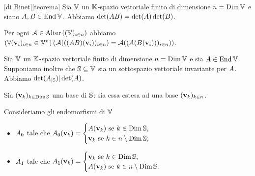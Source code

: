 \begin{Theorem}
	[di Binet][teorema]
  Sia $\mathbb{V}$ un $\mathbb{K}$-spazio vettoriale finito di dimensione
  $n = \operatorname{\operatorname{Dim}}{\mathbb{V}}$ e siano
  $A, B
    \in \operatorname{End}{\mathbb{V}}$.
  Abbiamo
  $\operatorname{det}(AB)
  = \operatorname{det}(A)\operatorname{det}(B)$.
\end{Theorem}
\Proof Per ogni
$\mathcal{A} \in \text{Alter} \left ( (\mathbb{V})_{i \in n} \right )$
abbiamo
$\left ( \forall (\mathbf{v}_i)_{i \in n} \in \mathbb{V}^n \right ) \left ( 
  \mathcal{A}(((AB)(
    \mathbf{v}_i))_{i \in n})
  = \mathcal{A}((A(B(
    \mathbf{v}_i)))_{i \in n}) \right )$. \EndProof
\begin{Corollary}
  Sia $\mathbb{V}$ un $\mathbb{K}$-spazio vettoriale finito di dimensione
  $n = \operatorname{\operatorname{Dim}}{\mathbb{V}}$ e sia
  $A \in \operatorname{End}{\mathbb{V}}$.
  Supponiamo inoltre che
  $\mathbb{S} \subseteq \mathbb{V}$
  sia un sottospazio vettoriale invariante per $A$.
  Abbiamo
  $\operatorname{det}({A}_{|\mathbb{S}})
  | \operatorname{det}(A)$.
\end{Corollary}
\Proof Sia 
$(\mathbf{v}_k)_{k \in \operatorname{Dim}{\mathbb{S}}}$
una base di $\mathbb{S}$:
sia essa estesa ad una base
$(\mathbf{v}_k)_{k \in n}$.
\par Consideriamo gli endomorfismi di $\mathbb{V}$
\begin{itemize}
  \item $A_0$ tale che
    $A_0(\mathbf{v}_k) =
      \begin{cases}
        A(\mathbf{v}_k)\text{ se }
          k \in \operatorname{Dim}{\mathbb{S}},\\
        \mathbf{v}_k\text{ se }
          k \in n \setminus \operatorname{Dim}{\mathbb{S}};
      \end{cases}$
  \item $A_1$ tale che
    $A_1(\mathbf{v}_k) =
      \begin{cases}
        \mathbf{v}_k\text{ se }
          k \in \operatorname{Dim}{\mathbb{S}},\\
        A(\mathbf{v}_k)\text{ se }
          k \in n \setminus \operatorname{Dim}{\mathbb{S}}.
      \end{cases}$
\end{itemize}
